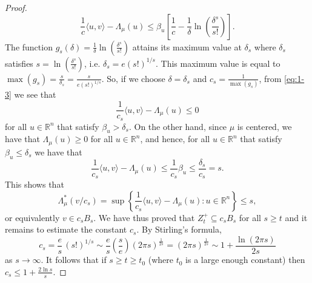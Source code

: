 \documentclass[10pt,a4paper]{amsart}
\newcommand{\gr}{\geqslant}
\newcommand{\ls}{\leqslant}
\begin{document}
\begin{proof}
\begin{equation}\label{eq:1-3}\frac{1}{c}\langle u,v\rangle-\Lambda_{\mu}(u) \ls
\beta_u \left[\frac{1}{c}-\frac{1}{\delta}\ln\left(\frac{\delta^s}{s!}\right)\right].\end{equation}
The function $g_s(\delta)=\frac{1}{\delta}\ln\left(\frac{\delta^s}{s!}\right)$ attains its maximum value
at $\delta_s$ where $\delta_s$ satisfies $s=\ln\left(\frac{\delta^s}{s!}\right)$, i.e. $\delta_s=e(s!)^{1/s}$.
This maximum value is equal to $\max(g_s)=\frac{s}{\delta_s}=\frac{s}{e(s!)^{1/s}}$. So, if we choose $\delta=\delta_s$
and $c_s=\frac{1}{\max(g_s)}$, from \eqref{eq:1-3} we see that
\begin{equation}\label{eq:1-4}\frac{1}{c_s}\langle u,v\rangle-\Lambda_{\mu}(u)\ls 0\end{equation}
for all $u\in\mathbb{R}^n$ that satisfy $\beta_u>\delta_s$. On the other hand, since $\mu$ is centered, we have that
$\Lambda_{\mu}(u)\gr 0$ for all $u\in\mathbb{R}^n$, and hence, for all $u\in\mathbb{R}^n$ that satisfy $\beta_u\ls\delta_s$ we have that
\begin{equation}\label{eq:1-5}\frac{1}{c_s}\langle u,v\rangle -\Lambda_\mu(u) \ls \frac{1}{c_s}\beta_u\ls \frac{\delta_s}{c_s}=s.\end{equation}
This shows that
$$\Lambda_{\mu}^{\ast}(v/c_s)=\sup\left\{\frac{1}{c_s}\langle u,v\rangle -\Lambda_{\mu}(u):u\in\mathbb{R}^n\right\}
\ls s,$$
or equivalently $v\in c_sB_s$. We have thus proved that $Z_t^+\subseteq c_sB_s$ for all $s\gr t$ and it remains to
estimate the constant $c_s$. By Stirling's formula,
$$c_s=\frac{e}{s}\,(s!)^{1/s}\sim \frac{e}{s}\left(\frac{s}{e}\right)(2\pi s)^{\frac{1}{2s}}=(2\pi s)^{\frac{1}{2s}}\sim
1+\frac{\ln(2\pi s)}{2s}$$
as $s\to\infty$. It follows that if $s\gr t\gr t_0$ (where $t_0$ is a large enough constant) then $c_s\ls 1+\frac{2\ln s}{s}$.
\end{proof}
\end{document}
